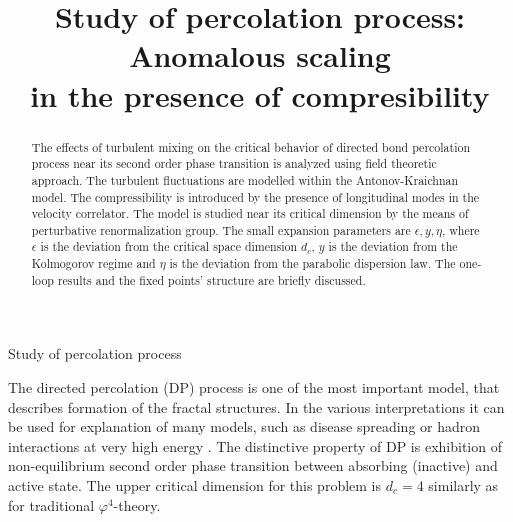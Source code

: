 


\thispagestyle{plain}


 {\sc Study of percolation process}

\STM

\title{Study of percolation process:\\ Anomalous scaling\\ in the presence of compresibility}


\address{$^{1}$ Dept. of Theoretical Physics, St-Petersburg State University,
 Russia\\
$^{2}$Inst. of Experimental Physics, Slovak Academy of Sciences, Ko\v{s}ice, Slovakia\\
$^{3}$ Faculty of sciences,P.J. \v{S}af\'{a}rik University,  Ko\v{s}ice, Slovakia}


\bigskip

\begin{abstract}
The effects of turbulent mixing on the critical behavior of directed bond percolation process near its second order phase transition is analyzed using field theoretic approach. The turbulent fluctuations are modelled within the Antonov-Kraichnan model. The compressibility is introduced by the presence of longitudinal modes in the velocity
correlator. The model is studied near its critical dimension by the means of perturbative renormalization group. The small expansion parameters are $\epsilon, y, \eta$, where $\epsilon$ is the deviation from the critical space dimension $d_c$, $y$ is the deviation from the Kolmogorov regime and $\eta$ is the deviation from the parabolic dispersion law. The one-loop results and the fixed points' structure are briefly discussed.
\end{abstract}

\vspace*{3mm}

The directed percolation (DP) process is one of the most important model, that describes formation
 of the fractal structures. In the various interpretations it can be used for explanation of
  many models, such as disease spreading \cite{ Jansen_Tauber_2004} or hadron interactions at very high
   energy \cite{Reggeon}. The distinctive property of DP is  exhibition of 
   non-equilibrium second order phase transition between absorbing (inactive) and active state. The upper critical dimension for this problem is $d_c=4$ similarly as for traditional $\varphi^4$-theory.

